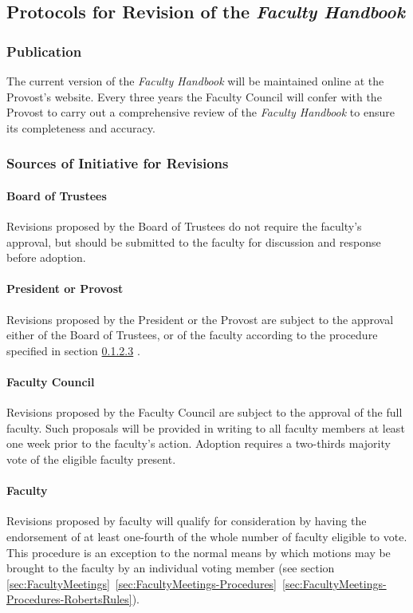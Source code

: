 	\subsection{Protocols for Revision of the \emph{Faculty Handbook}}
		\label{sec:ProtocolsForRevision}
		\subsubsection{Publication}
			\label{sec:ProtocolsForRevision-Publication}
			The current version of the \emph{Faculty Handbook} will be maintained online at the Provost's website. Every three years the Faculty Council will confer with the Provost to carry out a comprehensive review of the \emph{Faculty Handbook} to ensure its completeness and accuracy.
		\subsubsection{Sources of Initiative for Revisions}
			\label{sec:ProtocolsForRevision-Sources}
			\paragraph{Board of Trustees}
				Revisions proposed by the Board of Trustees do not require the faculty's approval, but should be submitted to the faculty for discussion and response before adoption.
			\paragraph{President or Provost}
				Revisions proposed by the President or the Provost are subject to the approval either of the Board of Trustees, or of the faculty according to the procedure specified in
				section
				\ref{sec:ProtocolsForRevision-Sources-FacultyCouncil}
				.

			\paragraph{Faculty Council}
				\label{sec:ProtocolsForRevision-Sources-FacultyCouncil}
				Revisions proposed by the Faculty Council are subject to the approval of the full faculty. Such proposals will be provided in writing to all faculty members at least one week prior to the faculty's action. Adoption requires a two-thirds majority vote of the eligible faculty present.
			\paragraph{Faculty}
				Revisions proposed by faculty will qualify for consideration by having the endorsement of at least one-fourth of the whole number of faculty eligible to vote. This procedure is an exception to the normal means by which motions may be brought to the faculty by an individual voting member (see
				section
				\ref{sec:FacultyMeetings}~\ref{sec:FacultyMeetings-Procedures}~\ref{sec:FacultyMeetings-Procedures-RobertsRules}).

